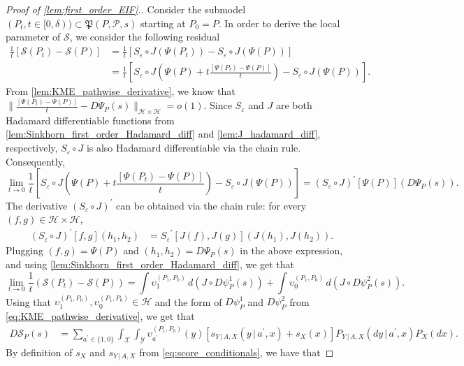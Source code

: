 \documentclass{article}
\theoremstyle{plain}
\theoremstyle{definition}
\theoremstyle{remark}
\newcommand{\of}[1]{\left(#1\right)}
\newcommand{\off}[1]{\left[#1\right]}
\newcommand{\cH}{\mathcal{H}}
\newcommand{\cP}{\mathcal{P}}
\newcommand{\cY}{\mathcal{Y}}
\newcommand{\cX}{\mathcal{X}}
\newcommand{\fP}{\mathfrak{P}}
\newcommand{\1}{\mathbbm{1}}
\newcommand{\STE}{\mathscr{S}}
\newcommand{\eps}{\varepsilon}
\theoremstyle{plain}
\theoremstyle{definition}
\newcommand{\mymid}{\,|\,}
\begin{document}
\begin{proof}[Proof of \cref{lem:first_order_EIF}.]
Consider the submodel $(P_t, t \in [0, \delta)) \subset \fP(P, \cP, s)$ starting at $P_0 = P$. In order to derive the local parameter of $\STE$, we consider the following residual
\begin{align*}
    \frac{1}{t} \off{\STE(P_t) - \STE(P)} &= \frac{1}{t} \off{S_\eps \circ J(\Psi(P_t)) - S_\eps \circ J(\Psi(P))}\\
    &= \frac{1}{t} \off{S_\eps \circ J\of{\Psi(P) + t\frac{\off{\Psi(P_t) - \Psi(P)}}{t}} - S_\eps \circ J(\Psi(P))}.
\end{align*}
From \cref{lem:KME_pathwise_derivative}, we know that $\big\|{\frac{\off{\Psi(P_t) - \Psi(P)}}{t} - D{\Psi}_P(s)}\big\|_{\cH \times \cH} = o(1)$. Since $S_\eps$ and $J$ are both Hadamard differentiable functions from \cref{lem:Sinkhorn_first_order_Hadamard_diff} and \cref{lem:J_hadamard_diff}, respectively, $S_\eps \circ J$ is also Hadamard differentiable via the chain rule. Consequently,
\[
\lim_{t\to 0} \frac{1}{t} \off{S_\eps \circ J \of{\Psi(P) + t\frac{\off{\Psi(P_t) - \Psi(P)}}{t}} - S_\eps \circ J (\Psi(P))} = (S_\eps \circ J)^\prime\off{\Psi(P)}\of{D{\Psi}_P(s)}.
\]
The derivative $(S_\eps \circ J)^\prime$ can be obtained via the chain rule: for every $(f, g) \in \cH \times \cH$,
\begin{align*}
    (S_\eps \circ J)^\prime[f, g](h_1, h_2) &=  {S_\eps}^\prime\off{ J(f), J(g)}\of{J(h_1), J(h_2)}.
\end{align*}
Plugging $(f,g) = \Psi(P)$ and $(h_1, h_2) = D\Psi_P(s)$ in the above expression, and using \cref{lem:Sinkhorn_first_order_Hadamard_diff}, we get that
\[
\lim_{t\to 0} \frac{1}{t}\of{\STE(P_t) - \STE(P)} = \int \upsilon_1^{(P_1, P_0)} \, d(J \circ D\psi^1_P(s)) + \int \upsilon_0^{(P_1, P_0)} \, d(J \circ D\psi^2_P(s)).
\]
Using that $\upsilon_1^{(P_1, P_0)}, \upsilon_0^{(P_1, P_0)} \in \cH$ and the form of $D\psi^1_P$ and $D\psi^2_P$ from \eqref{eq:KME_pathwise_derivative}, we get that
\begin{align*}
    D{\STE}_P(s) &= \sum_{a^\prime \in \{1,0\}} \int_\cX \int_\cY \upsilon_{a^\prime}^{(P_1, P_0)}(y) \off{s_{Y \mymid A, X}(y \mymid a^\prime, x) + s_X(x)} P_{Y \mymid A, X}(dy \mymid a^\prime, x) P_X(dx).
\end{align*}
By definition of $s_X$ and $s_{Y \mymid A, X}$ from \eqref{eq:score_conditionals}, we have that


\end{proof}
\end{document}
